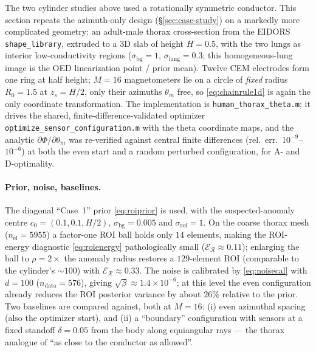 \documentclass[11pt,a4paper]{article}
\newcommand{\code}[1]{\texttt{#1}}
\begin{document}
The two cylinder studies above used a rotationally symmetric conductor. This section repeats the
azimuth-only design (\S\ref{sec:case-study}) on a markedly more complicated geometry: an
adult-male thorax cross-section from the EIDORS \code{shape\_library}, extruded to a 3D slab of
height $H=0.5$, with the two lungs as interior low-conductivity regions ($\sigma_{\mathrm{bg}}=1$,
$\sigma_{\mathrm{lung}}=0.3$; this homogeneous-lung image is the OED linearization point / prior
mean). Twelve CEM electrodes form one ring at half height; $M=16$ magnetometers lie on a circle of
\emph{fixed} radius $R_0=1.5$ at $z_s=H/2$, only their azimuths $\theta_m$ free, so
\eqref{eq:chainrule1d} is again the only coordinate transformation. The implementation is
\code{human\_thorax\_theta.m}; it drives the shared, finite-difference-validated optimizer
\code{optimize\_sensor\_configuration.m} with the theta coordinate maps, and the analytic
$\partial\Phi/\partial\theta_m$ was re-verified against central finite differences (rel.\ err.\
$10^{-9}$--$10^{-6}$) at both the even start and a random perturbed configuration, for A- and
D-optimality.

\paragraph{Prior, noise, baselines.} The diagonal ``Case~1'' prior \eqref{eq:roiprior} is used,
with the suspected-anomaly centre $c_0=(0.1,0.1,H/2)$, $\sigma_{\mathrm{bg}}=0.005$ and
$\sigma_{\mathrm{roi}}=1$. On the coarse thorax mesh ($n_{\mathrm{el}}=5955$) a factor-one ROI
ball holds only $14$ elements, making the ROI-energy diagnostic \eqref{eq:roienergy}
pathologically small ($\mathcal E_{\mathcal R}\approx0.11$); enlarging the ball to
$\rho=2\times$ the anomaly radius restores a $129$-element ROI (comparable to the cylinder's
$\sim\!100$) with $\mathcal E_{\mathcal R}\approx0.33$. The noise is calibrated by
\eqref{eq:noisecal} with $d=100$ ($n_{\mathrm{data}}=576$), giving $\sqrt\beta\approx1.4\times
10^{-6}$; at this level the even configuration already reduces the ROI posterior variance by about
$26\%$ relative to the prior. Two baselines are compared against, both at $M=16$: (i) even
azimuthal spacing (also the optimizer start), and (ii) a ``boundary'' configuration with sensors
at a fixed standoff $\delta=0.05$ from the body along equiangular rays --- the thorax analogue of
``as close to the conductor as allowed''.
\end{document}
